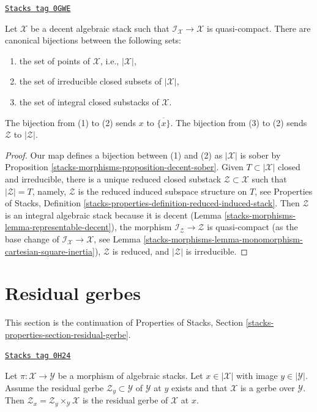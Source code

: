 \begin{lemma}
\label{stacks-morphisms-lemma-decent-irreducible-closed}
\href{https://stacks.math.columbia.edu/tag/0GWE}{\texttt{Stacks tag 0GWE}}

Let $\mathcal{X}$ be a decent algebraic stack such that
$\mathcal{I}_\mathcal{X} \to \mathcal{X}$ is quasi-compact.
There are canonical bijections between the following sets:
\begin{enumerate}
\item the set of points of $\mathcal{X}$, i.e., $|\mathcal{X}|$,
\item the set of irreducible closed subsets of $|\mathcal{X}|$,
\item the set of integral closed substacks of $\mathcal{X}$.
\end{enumerate}
The bijection from (1) to (2) sends $x$ to $\overline{\{x\}}$.
The bijection from (3) to (2) sends $\mathcal{Z}$ to $|\mathcal{Z}|$.
\end{lemma}

\begin{proof}
Our map defines a bijection between (1) and (2) as $|\mathcal{X}|$ is
sober by  Proposition \ref{stacks-morphisms-proposition-decent-sober}.
Given $T \subset |\mathcal{X}|$ closed and irreducible, there is a
unique reduced closed substack $\mathcal{Z} \subset \mathcal{X}$
such that $|\mathcal{Z}| = T$, namely, $\mathcal{Z}$
is the reduced induced subspace structure on $T$, see
Properties of Stacks, Definition
\ref{stacks-properties-definition-reduced-induced-stack}.
Then $\mathcal{Z}$ is an integral algebraic stack because it is
decent (Lemma \ref{stacks-morphisms-lemma-representable-decent}), the
morphism $\mathcal{I}_\mathcal{Z} \to \mathcal{Z}$ is quasi-compact
(as the base change of $\mathcal{I}_\mathcal{X} \to \mathcal{X}$, see
Lemma \ref{stacks-morphisms-lemma-monomorphism-cartesian-square-inertia}),
$\mathcal{Z}$ is reduced, and $|\mathcal{Z}|$ is irreducible.
\end{proof}

\section{Residual gerbes}
\label{stacks-morphisms-section-residual-gerbe}
This section is the continuation of Properties of Stacks, Section
\ref{stacks-properties-section-residual-gerbe}.

\begin{lemma}
\label{stacks-morphisms-lemma-gerbe-residual-gerbe}
\href{https://stacks.math.columbia.edu/tag/0H24}{\texttt{Stacks tag 0H24}}

Let $\pi : \mathcal{X} \to \mathcal{Y}$ be a morphism of algebraic stacks.
Let $x \in |\mathcal{X}|$ with image $y \in |\mathcal{Y}|$.
Assume the residual gerbe $\mathcal{Z}_y \subset \mathcal{Y}$
of $\mathcal{Y}$ at $y$ exists and that $\mathcal{X}$ is a gerbe
over $\mathcal{Y}$. Then
$\mathcal{Z}_x = \mathcal{Z}_y \times_\mathcal{Y} \mathcal{X}$ is
the residual gerbe of $\mathcal{X}$ at $x$.
\end{lemma}

